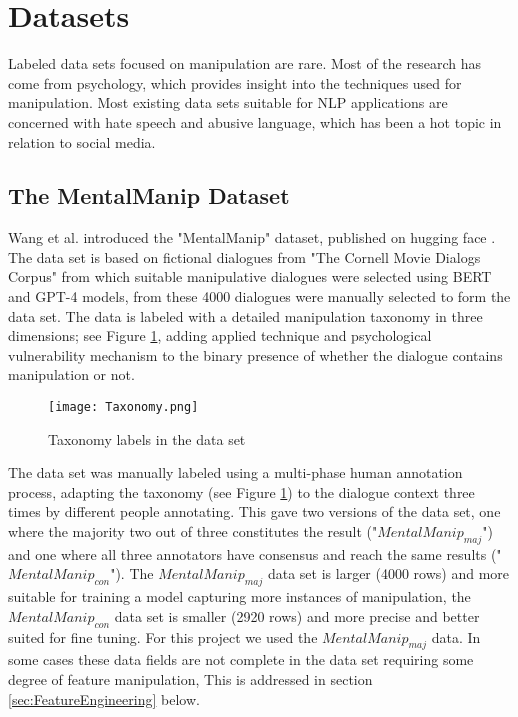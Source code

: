 \documentclass[
	letterpaper, %
	12pt, %
	unnumberedsections, %
	twoside, %
]{LTJournalArticle}
\begin{document}
\section{Datasets}
Labeled data sets focused on manipulation are rare. Most of the research has come from psychology, which provides insight into the techniques used for manipulation. Most existing data sets suitable for NLP applications are concerned with hate speech and abusive language, which has been a hot topic in relation to social media.

\subsection{The MentalManip Dataset}
Wang et al. \cite{MentalManip} introduced the "MentalManip" dataset, published on hugging face \cite{MentalManipDataset}. The data set is based on fictional dialogues from "The Cornell Movie Dialogs Corpus" \cite{CornellMovieCorpus} from which suitable manipulative dialogues were selected using BERT and GPT-4 models, from these 4000 dialogues were manually selected to form the data set. The data is labeled with a detailed manipulation taxonomy in three dimensions; see Figure \ref{fig:Taxonomy}, adding applied technique and psychological vulnerability mechanism to the binary presence of whether the dialogue contains manipulation or not.
\begin{figure}[!htp] %
	\centering
	\texttt{[image: Taxonomy.png]}
	\caption{Taxonomy labels in the data set}
	\label{fig:Taxonomy}
\end{figure}

The data set was manually labeled using a multi-phase human annotation process, adapting the taxonomy (see Figure \ref{fig:Taxonomy}) to the dialogue context three times by different people annotating. This gave two versions of the data set, one where the majority two out of three constitutes the result ("$MentalManip_{maj}$") and one where all three annotators have consensus and reach the same results ("$MentalManip_{con}$"). The $MentalManip_{maj}$ data set is larger (4000 rows) and more suitable for training a model capturing more instances of manipulation, the $MentalManip_{con}$ data set is smaller (2920 rows) and more precise and better suited for fine tuning. For this project we used the $MentalManip_{maj}$ data. In some cases these data fields are not complete in the data set requiring some degree of feature manipulation, This is addressed in section \ref{sec:FeatureEngineering} below.
\end{document}
